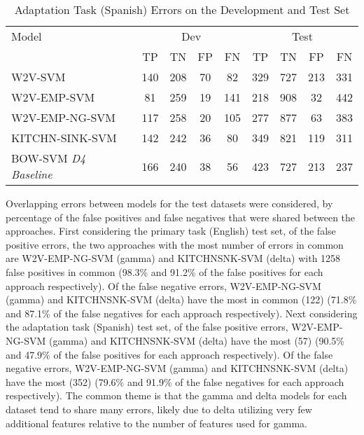 \documentclass[11pt,a4paper]{article}
\begin{document}
\begin{table}[hbt!]
\centering
\caption{Adaptation Task (Spanish) Errors on the Development and Test Set}
\label{tab:prim_class_test}
\tiny
\begin{tabular}{lcccc|cccc}
\hline
Model
            & \multicolumn{4}{c|}{Dev} & \multicolumn{4}{c}{Test} \\
    & TP & TN & FP & FN & TP & TN & FP & FN \\
\hline
W2V-SVM        & 140 & 208 & 70  & 82 & 329  & 727 & 213 & 331 \\
W2V-EMP-SVM    & 81 & 259 & 19  & 141 & 218  & 908 & 32 & 442 \\
W2V-EMP-NG-SVM & 117 & 258 & 20 & 105 & 277 & 877 & 63 & 383 \\
KITCHN-SINK-SVM & 142 & 242 & 36 & 80 & 349 & 821 & 119 & 311 \\
BOW-SVM \textit{D4 Baseline} & 166 & 240 & 38 & 56 & 423 & 727 & 213 & 237 \\
\hline
\end{tabular}
\end{table}




Overlapping errors between models for the test datasets were considered, by percentage of the false positives and false negatives that were shared between the approaches. First considering the primary task (English) test set, of the false positive errors, the two approaches with the most number of errors in common are W2V-EMP-NG-SVM (gamma) and KITCHNSNK-SVM (delta) with 1258 false positives in common (98.3\% and 91.2\% of the false positives for each approach respectively). Of the false negative errors, W2V-EMP-NG-SVM (gamma) and KITCHNSNK-SVM (delta) have the most in common (122) (71.8\% and  87.1\% of the false negatives for each approach respectively). Next considering the adaptation task (Spanish) test set, of the false positive errors, W2V-EMP-NG-SVM (gamma) and KITCHNSNK-SVM (delta) have the most (57) (90.5\% and 47.9\% of the false positives for each approach respectively). Of the false negative errors, W2V-EMP-NG-SVM (gamma) and KITCHNSNK-SVM (delta) have the most (352) (79.6\% and 91.9\% of the false negatives for each approach respectively). The common theme is that the gamma and delta models for each dataset tend to share many errors, likely due to delta utilizing very few additional features relative to the number of features used for gamma.
\end{document}
